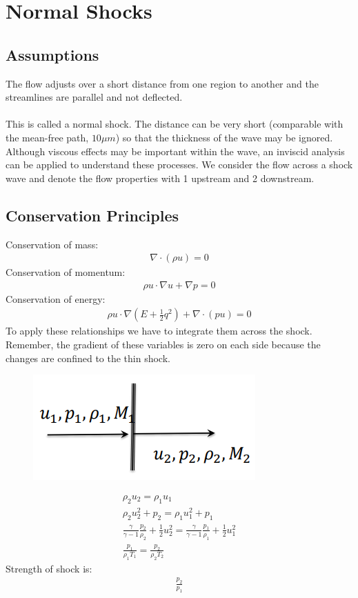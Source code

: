 \section{Normal Shocks}
\subsection{Assumptions}
The flow adjusts over a short distance from one region to another and the streamlines are parallel and not deflected.
\\\\
This is called a normal shock. The distance can be very short (comparable with the mean-free path, $10 \mu m$) so that the thickness of the wave may be ignored. Although viscous effects may be important within the wave, an inviscid analysis can be applied to understand these processes. We consider the flow across a shock wave and denote the flow properties with 1 upstream and 2 downstream.
\subsection{Conservation Principles}
Conservation of mass:
\begin{gather}
    \nabla \cdot (\rho u) = 0
\end{gather}
Conservation of momentum:
\begin{gather}
    \rho u \cdot \nabla u + \nabla p = 0
\end{gather}
Conservation of energy:
\begin{gather}
    \rho u \cdot \nabla \left( E + \frac{1}{2}q^2 \right) + \nabla \cdot (pu) = 0
\end{gather}
To apply these relationships we have to integrate them across the shock. Remember, the gradient of these variables is zero on each side because the changes are confined to the thin shock.
\begin{figure}[H]
    \centering
    \includegraphics[width = 0.5 \textwidth]{./img/diagram4.PNG}
    \caption{}
\end{figure}
\begin{gather}
    \rho_2 u_2 = \rho_1 u_1 \\[5pt]
    \rho_2 u_2^2 + p_2 = \rho_1 u_1^2 + p_1 \\[5pt]
    \frac{\gamma}{\gamma - 1} \frac{p_2}{\rho_2} + \frac{1}{2}u_2^2 = \frac{\gamma}{\gamma - 1} \frac{p_1}{\rho_1} + \frac{1}{2}u_1^2 \\[5pt]
    \frac{p_1}{\rho_1 T_1} = \frac{p_2}{\rho_2 T_2}
\end{gather}
Strength of shock is:
\begin{gather}
    \frac{p_2}{p_1}
\end{gather}
